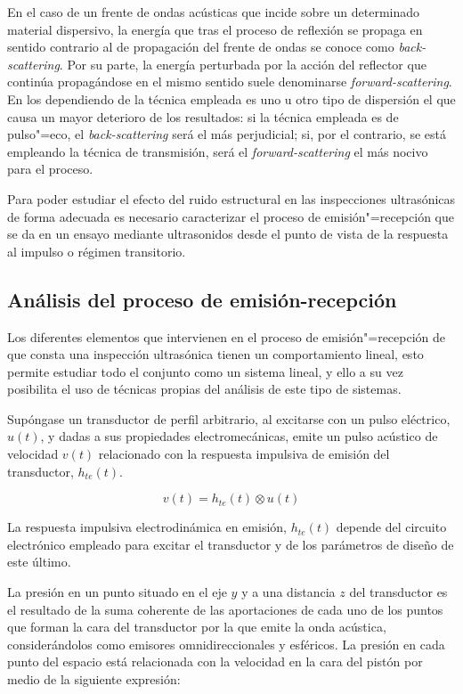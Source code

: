En el caso de un frente de ondas acústicas que incide sobre un determinado
material dispersivo, la energía que tras el proceso de reflexión se propaga
en sentido contrario al de propagación del frente de ondas se conoce como
\emph{back-scattering}. Por su parte, la energía perturbada por la acción
del reflector que continúa propagándose en el mismo sentido suele
denominarse \emph{forward-scattering}. En los  dependiendo de la
técnica empleada es uno u otro tipo de dispersión el que causa un mayor
deterioro de los resultados: si la técnica empleada es de pulso"=eco, el
\emph{back-scattering} será el más perjudicial; si, por el contrario, se
está empleando la técnica de transmisión, será el \emph{forward-scattering}
el más nocivo para el proceso.

Para poder estudiar el efecto del ruido estructural en las inspecciones
ultrasónicas de forma adecuada es necesario caracterizar el proceso de
emisión"=recepción que se da en un ensayo mediante ultrasonidos desde el
punto de vista de la respuesta al impulso o régimen transitorio.


\subsection{Análisis del proceso de emisión-recepción}

Los diferentes elementos que intervienen en el proceso de
emisión"=recepción de que consta una inspección ultrasónica tienen un
comportamiento lineal, esto permite estudiar todo el conjunto como un
sistema lineal, y ello a su vez posibilita el uso de técnicas propias del
análisis de este tipo de sistemas.

Supóngase un transductor de perfil arbitrario, al excitarse con un pulso
eléctrico, $u(t)$, y dadas a sus propiedades electromecánicas, emite un
pulso acústico de velocidad $v(t)$ relacionado con la respuesta impulsiva
de emisión del transductor, $h_{te}(t)$.

\begin{equation}
	v(t) = h_{te}(t)\otimes u(t)
	\label{eq:emiter}
\end{equation}

La respuesta impulsiva electrodinámica en emisión, $h_{te}(t)$ depende del
circuito electrónico empleado para excitar el transductor y de los
parámetros de diseño de este último.

La presión en un punto situado en el eje $y$ y a una distancia $z$ del
transductor es el resultado de la suma coherente de las aportaciones de
cada uno de los puntos que forman la cara del transductor por la que emite
la onda acústica, considerándolos como emisores omnidireccionales y
esféricos. La presión en cada punto del espacio está relacionada con la
velocidad en la cara del pistón por medio de la siguiente expresión:

